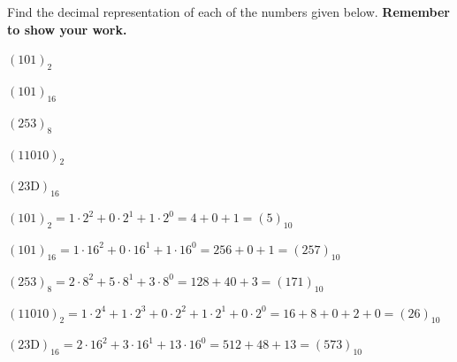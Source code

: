 \documentclass[12pt]{exam}
\begin{document}
Find the decimal representation of each of the numbers given below. \textbf{Remember to show your work.}
\begin{qparts}
    \item $(101)_2$
    \item $(101)_{16}$
    \item $(253)_{8}$
    \item $(11010)_2$
    \item $(23\text{D})_{16}$
\end{qparts}

\begin{solution}
\begin{qparts}
    \item $(101)_2 = 1 \cdot 2^2 + 0 \cdot 2^1 + 1 \cdot 2^0 = 4 + 0 + 1 = (5)_{10}$
    \item $(101)_{16} = 1 \cdot 16^2 + 0 \cdot 16^1 + 1 \cdot 16^0 = 256 + 0 + 1 = (257)_{10}$
    \item $(253)_8 = 2 \cdot 8^2 + 5 \cdot 8^1 + 3 \cdot 8^0 = 128 + 40 + 3 = (171)_{10}$
    \item $(11010)_2 = 1 \cdot 2^4 + 1 \cdot 2^3 + 0 \cdot 2^2 + 1 \cdot 2^1 + 0 \cdot 2^0 = 16 + 8 + 0 + 2 + 0 = (26)_{10}$
    \item $(23\text{D})_{16} = 2 \cdot 16^2 + 3 \cdot 16^1 + 13 \cdot 16^0 = 512 + 48 + 13 = (573)_{10}$
\end{qparts}
\end{solution}
\end{document}
